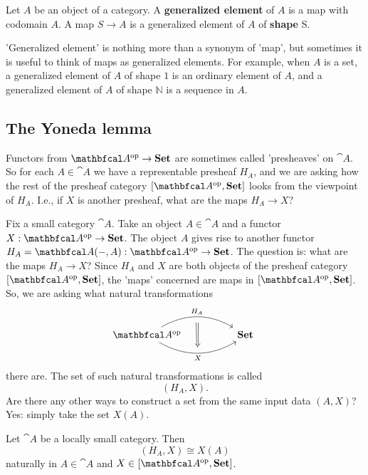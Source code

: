 \documentclass[11pt,a4paper]{article}
\begin{document}
\begin{definition}
    Let $A$ be an object of a category. A \textbf{generalized element} of $A$ is a map with codomain $A$. A map $S\to A$ is a generalized element of $A$ of \textbf{shape} S.
\end{definition}
'Generalized element' is nothing more than a synonym of 'map', but sometimes it is useful to think of maps as generalized elements. For example, when $A$ is a set, a generalized element of $A$ of shape $1$ is an ordinary element of $A$, and a generalized element of $A$ of shape $\mathbb{N}$ is a sequence in $A$.

\subsection{The Yoneda lemma}
Functors from $\catop{A}\to\bcat{Set}$ are sometimes called 'presheaves' on $\cat{A}$. So for each $A\in\cat{A}$ we have a representable presheaf $H_A$, and we are asking how the rest of the presheaf category $[\catop{A},\bcat{Set}]$ looks from the viewpoint of $H_A$. I.e., if $X$ is another presheaf, what are the maps $H_A\to X$?\par

Fix a small category $\cat{A}$. Take an object $A\in\cat{A}$ and a functor $X:\catop{A}\to\bcat{Set}$. The object $A$ gives rise to another functor $H_A=\cat{A}(-,A):\catop{A}\to\bcat{Set}$. The question is: what are the maps $H_A\to X$? Since $H_A$ and $X$ are both objects of the presheaf category $[\catop{A}, \bcat{Set}]$, the 'maps' concerned are maps in $[\catop{A},\bcat{Set}]$. So, we are asking what natural transformations
\begin{equation*}
\begin{tikzcd}
    \catop{A}
    \arrow[rr, bend left=30, "H_A"{name=t}]
    \arrow[rr, bend right=30, "X"'{name=b}]
    && \bcat{Set} \
    \arrow[from=t, Rightarrow, to=b, shorten <= 6pt, shorten >= 6pt]
\end{tikzcd}
\end{equation*}
there are. The set of such natural transformations is called
\begin{equation*}
    [\catop{A},\bcat{Set}](H_A,X).
\end{equation*}
Are there any other ways to construct a set from the same input data $(A,X)$? Yes: simply take the set $X(A)$.

\begin{theorem}[Yoneda]
    Let $\cat{A}$ be a locally small category. Then
    \begin{equation}
        [\catop{A},\bcat{Set}](H_A,X)\cong X(A)
    \end{equation}
    naturally in $A\in\cat{A}$ and $X\in [\catop{A},\bcat{Set}]$.
\end{theorem}
\end{document}
